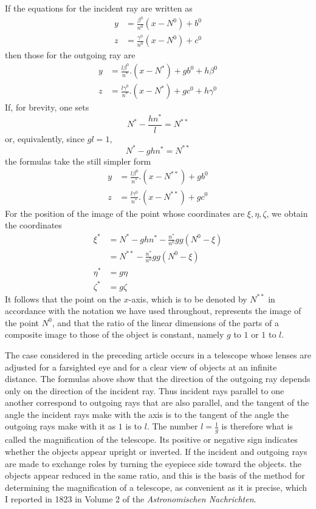 If the equations for the incident ray are written as
\[
\begin{aligned}
y&=\frac{\beta^0}{n^0}(x-N^0)+b^0\\
z&=\frac{\gamma^0}{n^0}(x-N^0)+c^0
\end{aligned}
\]
then those for the outgoing ray are
\[
\begin{aligned}
y&=\frac{l\beta^0}{n^*}.(x-N^*)+gb^0+h\beta^0\\
z&=\frac{l\gamma^0}{n^*}.(x-N^*)+gc^0+h\gamma^0
\end{aligned}
\]
If, for brevity, one sets
\[
N^*-\frac{hn^*}{l}=N^{**}
\]
or, equivalently, since $gl=1$,
\[
N^*-ghn^*=N^{**}
\]
the formulas take the still simpler form
\[
\begin{aligned}
y&=\frac{l\beta^0}{n^*}.(x-N^{**})+gb^0\\
z&=\frac{l\gamma^0}{n^*}.(x-N^{**})+gc^0
\end{aligned}
\]
For the position of the image of the point whose coordinates are $\xi,\eta,\zeta$, we obtain the coordinates
\[
\begin{aligned}
\xi^*&=N^*-ghn^*-\frac{n^*}{n^0}gg(N^0-\xi)\\
&=N^{**}-\frac{n^*}{n^0}gg(N^0-\xi)\\
\eta^*&=g\eta\\
\zeta^*&=g\zeta
\end{aligned}
\]
It follows that the point on the $x$-axis, which is to be denoted by $N^{**}$ in accordance with the notation we have used throughout, represents the image of the point $N^0$, and that the ratio of the linear dimensions of the parts of a composite image to those of the object is constant, namely $g$ to $1$ or $1$ to $l$.

The case considered in the preceding article occurs in a telescope whose lenses are adjusted for a farsighted eye and for a clear view of objects at an infinite distance. The formulas above show that the direction of the outgoing ray depends only on the direction of the incident ray. Thus incident rays parallel to one another correspond to outgoing rays that are also parallel, and the tangent of the angle the incident rays make with the axis is to the tangent of the angle the outgoing rays make with it as $1$ is to $l$. The number $l=\frac1g$ is therefore what is called the magnification of the telescope. Its positive or negative sign indicates whether the objects appear upright or inverted. If the incident and outgoing rays are made to exchange roles by turning the eyepiece side toward the objects. the objects appear reduced in the same ratio, and this is the basis of the method for determining the magnification of a telescope, as convenient as it is precise, which I reported in 1823 in Volume 2 of the \textit{Astronomischen Nachrichten}.

